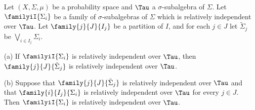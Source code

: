   Let
$(X,\Sigma,\mu)$ be a probability space and $\Tau$ a $\sigma$-subalgebra of
$\Sigma$.
Let $\familyiI{\Sigma_i}$ be a family of $\sigma$-subalgebras of
$\Sigma$ which is relatively independent over $\Tau$.   Let
$\family{j}{J}{I_j}$ be a partition of $I$, and for each $j\in J$ let
$\tilde\Sigma_j$ be $\bigvee_{i\in I_j}\Sigma_i$.

(a) If $\familyiI{\Sigma_i}$ is relatively independent over $\Tau$,
then $\family{j}{J}{\tilde\Sigma_j}$ is
relatively independent over $\Tau$.

(b) Suppose that
$\family{j}{J}{\tilde\Sigma_j}$ is relatively independent over $\Tau$ and
that $\family{i}{I_j}{\Sigma_i}$ is relatively independent over $\Tau$ for
every $j\in J$.   Then $\familyiI{\Sigma_i}$ is relatively independent
over $\Tau$.

